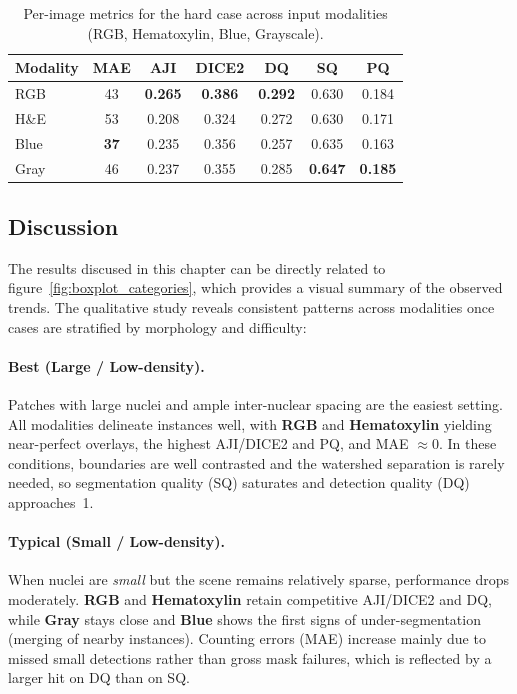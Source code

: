 \documentclass[target=bach,aauheader=,style=]{thud}
\begin{document}
\begin{table}[ht]
\centering
\caption{Per-image metrics for the hard case across input modalities (RGB, Hematoxylin, Blue, Grayscale). }
\label{tab:worst_metrics}
\begin{tabular}{lcccccc}
\toprule
Modality & MAE & AJI & DICE2 & DQ & SQ & PQ \\
\midrule
RGB  & 43 & \textbf{0.265} & \textbf{0.386} & \textbf{0.292} & 0.630 & 0.184 \\
H\&E & 53 & 0.208 & 0.324 & 0.272 & 0.630 & 0.171 \\
Blue & \textbf{37} & 0.235 & 0.356 & 0.257 & 0.635 & 0.163 \\
Gray & 46 & 0.237 & 0.355 & 0.285 & \textbf{0.647} & \textbf{0.185} \\
\bottomrule
\end{tabular}
\end{table}
\subsection{Discussion}
The results discused in this chapter can be directly related to figure~\ref{fig:boxplot_categories}, which provides a visual summary of the observed trends. The qualitative study reveals consistent patterns across modalities once cases are stratified by morphology and difficulty:

\paragraph{Best (Large / Low-density).}
Patches with large nuclei and ample inter-nuclear spacing are the easiest setting. All modalities delineate instances well, with \textbf{RGB} and \textbf{Hematoxylin} yielding near-perfect overlays, the highest AJI/DICE2 and PQ, and MAE $\approx 0$. In these conditions, boundaries are well contrasted and the watershed separation is rarely needed, so segmentation quality (SQ) saturates and detection quality (DQ) approaches~1.

\paragraph{Typical (Small / Low-density).}
When nuclei are \emph{small} but the scene remains relatively sparse, performance drops moderately. \textbf{RGB} and \textbf{Hematoxylin} retain competitive AJI/DICE2 and DQ, while \textbf{Gray} stays close and \textbf{Blue} shows the first signs of under-segmentation (merging of nearby instances). Counting errors (MAE) increase mainly due to missed small detections rather than gross mask failures, which is reflected by a larger hit on DQ than on SQ.
\end{document}
